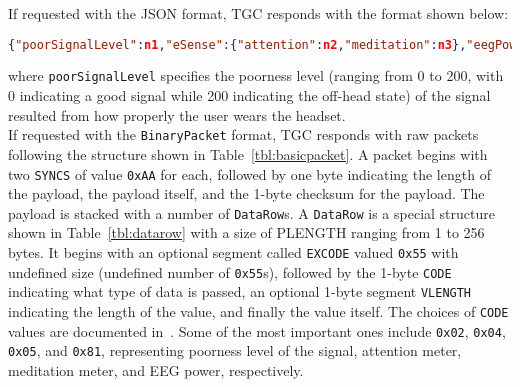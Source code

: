 %
\indent If requested with the JSON format, TGC responds with the format shown below:
\begin{lstlisting}[language=json]
{"poorSignalLevel":n1,"eSense":{"attention":n2,"meditation":n3},"eegPower":{"delta":n4,"theta":n5,"lowAlpha":n6,"highAlpha":n7,"lowBeta":n8,"highBeta":n9,"lowGamma":n10,"highGamma":n11}}
\end{lstlisting}
where \texttt{poorSignalLevel} specifies the poorness level (ranging from 0 to 200, with 0 indicating a good signal while 200 indicating the off-head state) of the signal resulted from how properly the user wears the headset.\\
%
\indent If requested with the \texttt{BinaryPacket} format, TGC responds with raw packets following the structure shown in Table~\ref{tbl:basicpacket}. A packet begins with two \texttt{SYNCS} of value \texttt{0xAA} for each, followed by one byte indicating the length of the payload, the payload itself, and the 1-byte checksum for the payload. The payload is stacked with a number of \texttt{DataRow}s. A  \texttt{DataRow} is a special structure shown in Table~\ref{tbl:datarow} with a size of PLENGTH ranging from 1 to 256 bytes. It begins with an optional segment called \texttt{EXCODE} valued \texttt{0x55} with undefined size (undefined number of \texttt{0x55}s), followed by the 1-byte \texttt{CODE} indicating what type of data is passed, an optional 1-byte segment \texttt{VLENGTH} indicating the length of the value, and finally the value itself. The choices of \texttt{CODE} values are documented in~\cite{tgsprawpacket}. Some of the most important ones include \texttt{0x02}, \texttt{0x04}, \texttt{0x05}, and \texttt{0x81}, representing poorness level of the signal, attention meter, meditation meter, and EEG power, respectively. 

